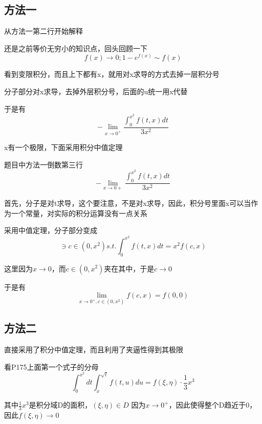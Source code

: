 \documentclass[a4paper]{ctexart}
\begin{document}
\begin{multicols}{2}
\subsection{方法一}
\par 从方法一第二行开始解释
\par 还是之前等价无穷小的知识点，回头回顾一下
\begin{equation}
f(x)\rightarrow 0; 1-e^{f(x)} \sim f(x) 
\end{equation}
\par 看到变限积分，而且上下都有x，就用对x求导的方式去掉一层积分号
\par 分子部分对x求导，去掉外层积分号，后面的u统一用x代替
\par 于是有
\begin{equation}
   -\lim_{x \rightarrow 0^+}
   {
       \frac{
           \int_{0}^{x^2}{f(t,x)dt}
       }
       {3x^2}
   } 
\end{equation}
\par x有一个极限，下面采用积分中值定理


\par 题目中方法一倒数第三行
\begin{equation}
-\lim_{x \rightarrow 0+}{
    \frac{
        \int_{0}^{x^2}{f(t,x)dt}
    }
    {3x^2}
}
\end{equation}
\par 首先，分子是对t求导，这个要注意，不是对x求导，因此，积分号里面x可以当作为一个常量，对实际的积分运算没有一点关系
\par 采用中值定理，分子部分变成
\begin{equation}
\ni c \in (0, x^2) s.t. \int_{0}^{x^2}{f(t,x)dt}
= x^2f(c,x)
\end{equation}
\par 这里因为$x\rightarrow 0$，而$c \in (0, x^2)$夹在其中，于是$c\rightarrow 0$
\par 于是有
\begin{equation}
\lim_{x\rightarrow 0^+, c\in(0, x^2)}{f(c,x)} = f(0,0)
\end{equation}

\subsection{方法二}
\par 直接采用了积分中值定理，而且利用了夹逼性得到其极限
\par 看P175上面第一个式子的分母
\begin{equation}
\int_{0}^{x^2}dt\int_{x}^{\sqrt{t}}{f(t,u)du}
=
f(\xi, \eta) \cdot \frac{1}{3}x^3
\end{equation}
\par 其中$\frac{1}{3}x^3$是积分域D的面积，$(\xi, \eta) \in D$
因为$x\rightarrow 0^+$，因此使得整个D趋近于0，因此$f(\xi,\eta) \rightarrow 0$

















\end{multicols}
\end{document}
